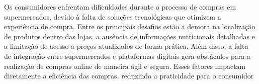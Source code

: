 \hspace{4.5mm}
Os consumidores enfrentam dificuldades durante o processo de compras em supermercados, devido à falta de soluções tecnológicas que otimizem a experiência de compra. Entre os principais desafios estão a demora na localização de produtos dentro das lojas, a ausência de informações nutricionais detalhadas e a limitação de acesso a preços atualizados de forma prática. Além disso, a falta de integração entre supermercados e plataformas digitais gera obstáculos para a realização de compras online de maneira ágil e segura. Esses fatores impactam diretamente a eficiência das compras, reduzindo a praticidade para o consumidor